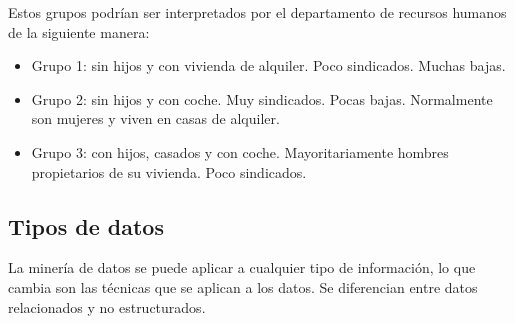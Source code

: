 \documentclass{article}
\begin{document}
Estos grupos podrían ser interpretados por el departamento de recursos humanos de la siguiente manera:
\begin{itemize}
\item Grupo 1: sin hijos y con vivienda de alquiler. Poco sindicados. Muchas bajas.
\item Grupo 2: sin hijos y con coche. Muy sindicados. Pocas bajas. Normalmente son mujeres y viven en casas de alquiler.
\item Grupo 3: con hijos, casados y con coche. Mayoritariamente hombres propietarios de su vivienda. Poco sindicados.
\end{itemize}


\subsection{Tipos de datos}

La minería de datos se puede aplicar a cualquier tipo de información, lo que cambia son las técnicas que se aplican a los datos. Se diferencian entre datos relacionados y no estructurados.

  
\end{document}
